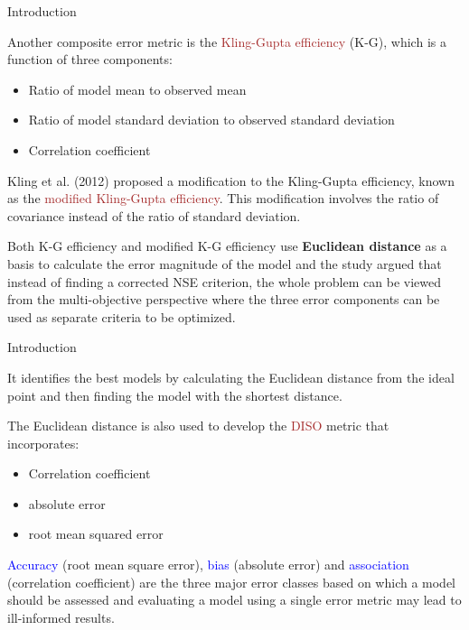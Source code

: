 \documentclass[xcolor={dvipsnames}]{beamer}
\begin{document}
\begin{frame}{Introduction}

Another composite error metric is the \textcolor{brown}{Kling-Gupta efficiency} (K-G), which is a function of three components:
\begin{itemize}
    \item Ratio of model mean to observed mean
    \item Ratio of model standard deviation to observed standard deviation
    \item Correlation coefficient
\end{itemize} 

\pause

\hfill

Kling et al. (2012) proposed a modification to the Kling-Gupta efficiency, known as the \textcolor{brown}{modified Kling-Gupta efficiency}. This modification involves the ratio of covariance instead of the ratio of standard deviation.

\pause

\hfill

Both K-G efficiency and modified K-G efficiency use \textbf{Euclidean distance} as a basis to calculate the error magnitude of the model and the study argued that instead of finding a corrected NSE criterion, the whole problem can be viewed from the multi-objective perspective where the three error components can be used as separate criteria to be optimized. 

\end{frame}

\begin{frame}{Introduction}

It identifies the best models by calculating the Euclidean distance from the ideal point and then finding the model with the shortest distance.

\hfill

The Euclidean distance is also used to develop the \textcolor{brown}{DISO} metric that incorporates:
\begin{itemize}
    \item Correlation coefficient
    \item absolute error
    \item root mean squared error
\end{itemize}

\pause

\hfill

\textcolor{blue}{Accuracy} (root mean square error), \textcolor{blue}{bias} (absolute error) and \textcolor{blue}{association} (correlation coefficient) are the three major error classes based on which a model should be assessed and evaluating a model using a single error metric may lead to ill-informed results.

\end{frame}
\end{document}
